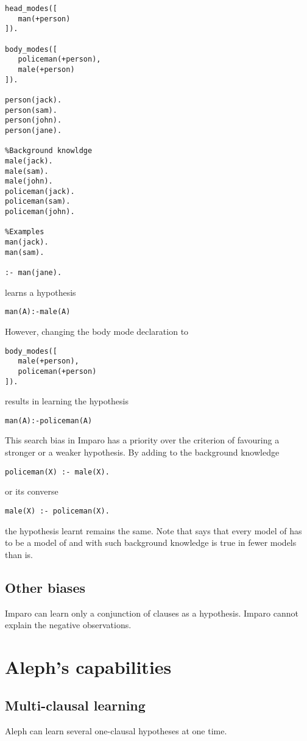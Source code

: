 \begin{lstlisting}
head_modes([
   man(+person)
]).

body_modes([
   policeman(+person),
   male(+person)
]).

person(jack).
person(sam).
person(john).
person(jane).

%Background knowldge
male(jack).
male(sam).
male(john).
policeman(jack).
policeman(sam).
policeman(john).

%Examples
man(jack).
man(sam).

:- man(jane).
\end{lstlisting}
learns a hypothesis
\begin{lstlisting}
man(A):-male(A)
\end{lstlisting}
However, changing the body mode declaration to
\begin{lstlisting}
body_modes([   
   male(+person),
   policeman(+person)
]).
\end{lstlisting}
results in learning the hypothesis
\begin{lstlisting}
man(A):-policeman(A)
\end{lstlisting}

This search bias in Imparo has a priority over the criterion of favouring a stronger or a weaker hypothesis. By adding to the background knowledge
\begin{lstlisting}
policeman(X) :- male(X).
\end{lstlisting}
or its converse
\begin{lstlisting}
male(X) :- policeman(X).
\end{lstlisting}
the hypothesis learnt remains the same.
Note that  says that every model of  has to be a model of  and with such background knowledge  is true in fewer models than  is.

\subsection{Other biases}
Imparo can learn only a conjunction of clauses as a hypothesis.
Imparo cannot explain the negative observations.

\section{Aleph's capabilities}

\subsection{Multi-clausal learning}
Aleph can learn several one-clausal hypotheses at one time.

